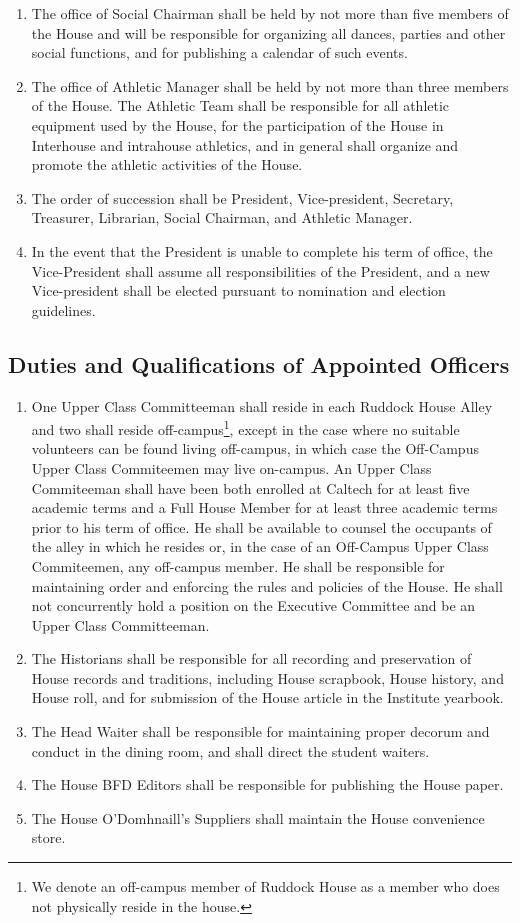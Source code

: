 \documentclass[10pt]{article} %
\begin{document}
\begin{enumerate}
\item The office of Social Chairman shall be held by not more than five members of the House and will be responsible for organizing all dances, parties and other social functions, and for publishing a calendar of such events.
\item The office of Athletic Manager shall be held by not more than three members of the House. The Athletic Team shall be responsible for all athletic equipment used by the House, for the participation of the House in Interhouse and intrahouse athletics, and in general shall organize and promote the athletic activities of the House.
\item The order of succession shall be President, Vice-president, Secretary, Treasurer, Librarian, Social Chairman, and Athletic Manager.
\item In the event that the President is unable to complete his term of office, the Vice-President shall assume all responsibilities of the President, and a new Vice-president shall be elected pursuant to nomination and election guidelines.
\end{enumerate}
\subsection{Duties and Qualifications of Appointed Officers}
\begin{enumerate}
\item One Upper Class Committeeman shall reside in each Ruddock House Alley and two shall reside off-campus\footnote{We denote an off-campus member of Ruddock House as a member who does not physically reside in the house.}, except in the case where no suitable volunteers can be found living off-campus, in which case the Off-Campus Upper Class Commiteemen may live on-campus. An Upper Class Commiteeman shall have been both enrolled at Caltech for at least five academic terms and a Full House Member for at least three academic terms prior to his term of office. He shall be available to counsel the occupants of the alley in which he resides or, in the case of an Off-Campus Upper Class Commiteemen, any off-campus member. He shall be responsible for maintaining order and enforcing the rules and policies of the House. He shall not concurrently hold a position on the Executive Committee and be an Upper Class Committeeman.
\item The Historians shall be responsible for all recording and preservation of House records and traditions, including House scrapbook, House history, and House roll, and for submission of the House article in the Institute yearbook.
\item The Head Waiter shall be responsible for maintaining proper decorum and conduct in the dining room, and shall direct the student waiters.
\item The House BFD Editors shall be responsible for publishing the House paper.
\item The House O’Domhnaill’s Suppliers shall maintain the House convenience store.
\end{enumerate}
\end{document}
